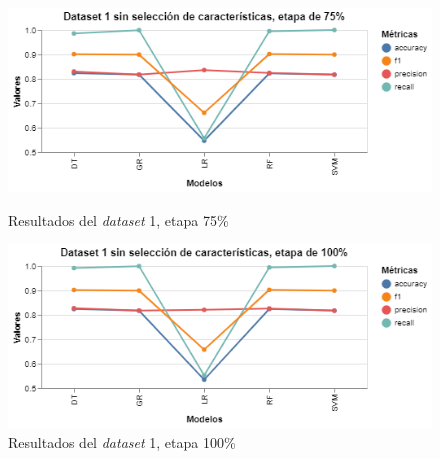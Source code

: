 \begin{figure}[htbp]
    \centering
    \begin{minipage}[t]{0.50\textwidth}
        \centering
        \includegraphics[width = \textwidth]{Graphics/dataset_1_75.png}
        \caption{Resultados del \textit{dataset} 1, etapa 75\%}
        \label{dataset1_75}
    \end{minipage}\hfill
    \begin{minipage}[t]{0.50\textwidth}
        \centering
        \includegraphics[width = \textwidth]{Graphics/datatset_1_100.png}
        \caption{Resultados del \textit{dataset} 1, etapa 100\%}
        \label{dataset1_100}
    \end{minipage}
\end{figure}  


